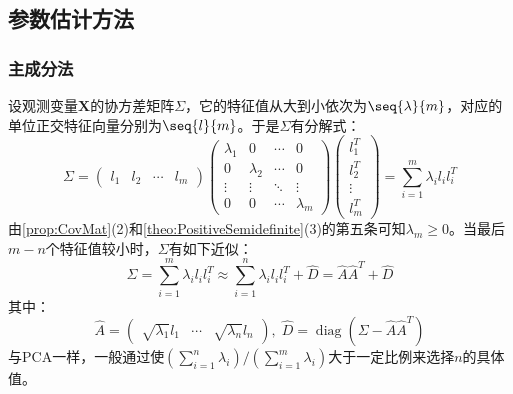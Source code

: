 \subsection{参数估计方法}
\subsubsection{主成分法}
\begin{method}
	设观测变量$\mathbf{X}$的协方差矩阵$\Sigma$，它的特征值从大到小依次为$\seq{\lambda}{m}$，对应的单位正交特征向量分别为$\seq{l}{m}$。于是$\Sigma$有分解式：
	\begin{equation*}
		\Sigma=
		\begin{pmatrix}
			l_1 & l_2 & \cdots &l_m
		\end{pmatrix}
		\begin{pmatrix}
			\lambda_1 & 0 & \cdots & 0 \\
			0 & \lambda_2 & \cdots & 0 \\
			\vdots & \vdots & \ddots & \vdots \\
			0 & 0 & \cdots & \lambda_m
		\end{pmatrix}
		\begin{pmatrix}
			l_1^T \\
			l_2^T \\
			\vdots \\
			l_m^T
		\end{pmatrix}
		=\sum_{i=1}^{m}\lambda_il_il_i^T
	\end{equation*}
	由\cref{prop:CovMat}(2)和\cref{theo:PositiveSemidefinite}(3)的第五条可知$\lambda_m\geqslant0$。当最后$m-n$个特征值较小时，$\Sigma$有如下近似：
	\begin{equation*}
		\Sigma=\sum_{i=1}^{m}\lambda_il_il_i^T\approx\sum_{i=1}^{n}\lambda_il_il_i^T+\hat{D}=\hat{A}\hat{A}^T+\hat{D}
	\end{equation*}
	其中：
	\begin{equation*}
		\hat{A}=
		\begin{pmatrix}
			\sqrt{\lambda_1}l_1 & \cdots & \sqrt{\lambda_n}l_n
		\end{pmatrix},\;
		\hat{D}=\operatorname{diag}(\Sigma-\hat{A}\hat{A}^T)
	\end{equation*}
	与PCA一样，一般通过使$\left(\sum\limits_{i=1}^{n}\lambda_i\right)\Big/\left(\sum\limits_{i=1}^{m}\lambda_i\right)$大于一定比例来选择$n$的具体值。
\end{method}
